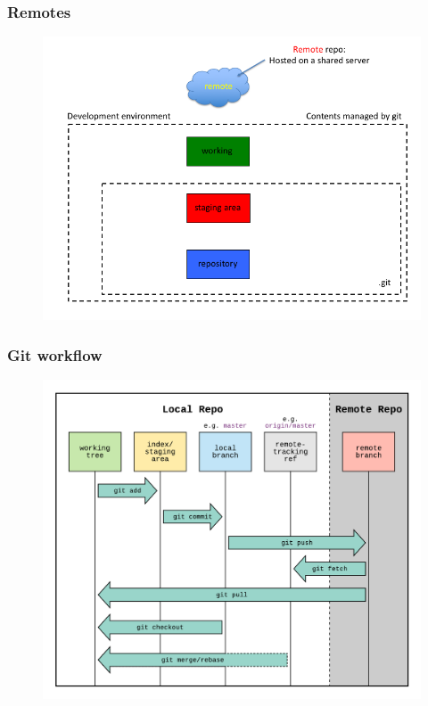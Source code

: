 \documentclass[11pt]{beamer}
\begin{document}

\begin{frame}[fragile]
\frametitle{Remotes}

\begin{figure}[htp]
 \centering
 \includegraphics[scale=0.35]{git_remotes_2.png}
\end{figure}

\end{frame}



\begin{frame}[fragile]
\frametitle{Git workflow}
\begin{figure}[htp]
 \centering
 \includegraphics[scale=0.20]{git_workflow.png}
\end{figure}


\end{frame}
\end{document}
